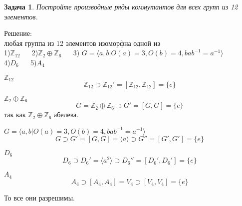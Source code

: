 \documentclass[a4paper,12pt]{article}
\theoremstyle{neosn}
\newtheorem{problem}{Задача}
\begin{document}
\newpage
\begin{problem}
    Постройте производные ряды коммутантов для всех групп из 12 элементов.
\end{problem}
Решение:\\
любая группа из 12 элементов изоморфна одной из\\
1)$\mathbb{Z}_{12}$ ~~ 2)$\mathbb{Z}_2 \oplus \mathbb{Z}_6$ ~~ 3) $G=\langle a,b|O(a)=3,O(b)=4,bab^{-1}=a^{-1}\rangle$\\
4)$D_6$ ~~ 5)$A_4$
\begin{enumerate}
    \begin{item}{$\mathbb{Z}_{12}$}
        $$ \mathbb{Z}_{12} \supset \mathbb{Z}_{12}'=[\mathbb{Z}_{12},\mathbb{Z}_{12}]=\{e\} $$
    \end{item}
    \begin{item}{$\mathbb{Z}_2 \oplus \mathbb{Z}_6$}
        $$G = \mathbb{Z}_2 \oplus \mathbb{Z}_6 \supset G'=[G,G]=\{e\}$$
        так как $\mathbb{Z}_2 \oplus \mathbb{Z}_6$ абелева.
    \end{item}
    \begin{item}{$G=\langle a,b|O(a)=3,O(b)=4,bab^{-1}=a^{-1}\rangle$}
        $$G \supset G'=[G,G]=\langle a \rangle \supset G''=[G',G']=\{e\}$$
    \end{item}
    \begin{item}{$D_6$}
        $$D_6 \supset D_6'=\langle a^2 \rangle \supset D_6''=[D_6',D_6']=\{e\}$$
    \end{item}
    \begin{item}{$A_4$}
        $$A_4 \supset [A_4,A_4]=V_4 \supset [V_4,V_4]=\{e\}$$
    \end{item}
\end{enumerate}
То все они разрешимы.
\end{document}
